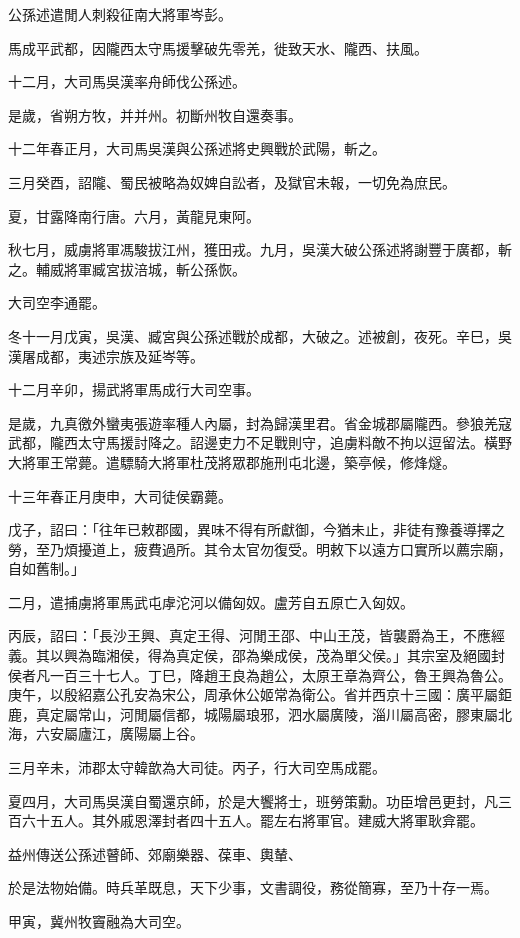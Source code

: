 \begin{pinyinscope}
公孫述遣閒人刺殺征南大將軍岑彭。

馬成平武都，因隴西太守馬援擊破先零羌，徙致天水、隴西、扶風。

十二月，大司馬吳漢率舟師伐公孫述。

是歲，省朔方牧，并并州。初斷州牧自還奏事。

十二年春正月，大司馬吳漢與公孫述將史興戰於武陽，斬之。

三月癸酉，詔隴、蜀民被略為奴婢自訟者，及獄官未報，一切免為庶民。

夏，甘露降南行唐。六月，黃龍見東阿。

秋七月，威虜將軍馮駿拔江州，獲田戎。九月，吳漢大破公孫述將謝豐于廣都，斬之。輔威將軍臧宮拔涪城，斬公孫恢。

大司空李通罷。

冬十一月戊寅，吳漢、臧宮與公孫述戰於成都，大破之。述被創，夜死。辛巳，吳漢屠成都，夷述宗族及延岑等。

十二月辛卯，揚武將軍馬成行大司空事。

是歲，九真徼外蠻夷張遊率種人內屬，封為歸漢里君。省金城郡屬隴西。參狼羌寇武都，隴西太守馬援討降之。詔邊吏力不足戰則守，追虜料敵不拘以逗留法。橫野大將軍王常薨。遣驃騎大將軍杜茂將眾郡施刑屯北邊，築亭候，修烽燧。

十三年春正月庚申，大司徒侯霸薨。

戊子，詔曰：「往年已敕郡國，異味不得有所獻御，今猶未止，非徒有豫養導擇之勞，至乃煩擾道上，疲費過所。其令太官勿復受。明敕下以遠方口實所以薦宗廟，自如舊制。」

二月，遣捕虜將軍馬武屯虖沱河以備匈奴。盧芳自五原亡入匈奴。

丙辰，詔曰：「長沙王興、真定王得、河閒王邵、中山王茂，皆襲爵為王，不應經義。其以興為臨湘侯，得為真定侯，邵為樂成侯，茂為單父侯。」其宗室及絕國封侯者凡一百三十七人。丁巳，降趙王良為趙公，太原王章為齊公，魯王興為魯公。庚午，以殷紹嘉公孔安為宋公，周承休公姬常為衛公。省并西京十三國：廣平屬鉅鹿，真定屬常山，河閒屬信都，城陽屬琅邪，泗水屬廣陵，淄川屬高密，膠東屬北海，六安屬廬江，廣陽屬上谷。

三月辛未，沛郡太守韓歆為大司徒。丙子，行大司空馬成罷。

夏四月，大司馬吳漢自蜀還京師，於是大饗將士，班勞策勳。功臣增邑更封，凡三百六十五人。其外戚恩澤封者四十五人。罷左右將軍官。建威大將軍耿弇罷。

益州傳送公孫述瞽師、郊廟樂器、葆車、輿輦、

於是法物始備。時兵革既息，天下少事，文書調役，務從簡寡，至乃十存一焉。

甲寅，冀州牧竇融為大司空。


\end{pinyinscope}

